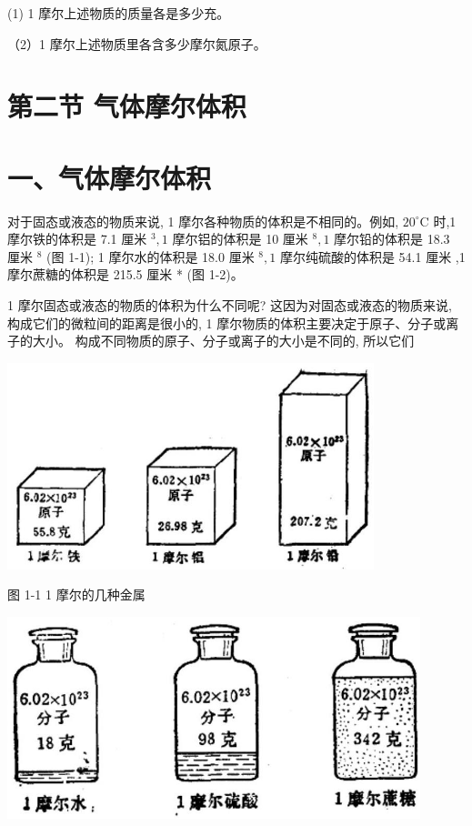 \documentclass[10pt]{article}
\begin{document}
(1) 1 摩尔上述物质的质量各是多少充。

（2）1 摩尔上述物质里各含多少摩尔氮原子。

\section*{第二节 气体摩尔体积}

\section*{一、气体摩尔体积}

对于固态或液态的物质来说, 1 摩尔各种物质的体积是不相同的。例如, \({20}^{ \circ }\mathrm{C}\) 时,1 摩尔铁的体积是 7.1 厘米 \({}^{3},1\) 摩尔铝的体积是 10 厘米 \({}^{8},1\) 摩尔铅的体积是 18.3 厘米 \({}^{8}\) (图 1-1); 1 摩尔水的体积是 18.0 厘米 \({}^{8},1\) 摩尔纯硫酸的体积是 54.1 厘米 ,1 摩尔蔗糖的体积是 215.5 厘米 * (图 1-2)。

1 摩尔固态或液态的物质的体积为什么不同呢? 这因为对固态或液态的物质来说, 构成它们的微粒间的距离是很小的, 1 摩尔物质的体积主要决定于原子、分子或离子的大小。 构成不同物质的原子、分子或离子的大小是不同的, 所以它们

\begin{center}
\includegraphics[max width=0.8\textwidth]{images/01912d0f-097c-7e75-8f32-4f326cd86c9f_14_662342.jpg}
\end{center}

图 1-1 1 摩尔的几种金属

\begin{center}
\includegraphics[max width=0.9\textwidth]{images/01912d0f-097c-7e75-8f32-4f326cd86c9f_14_118708.jpg}
\end{center}
\end{document}
